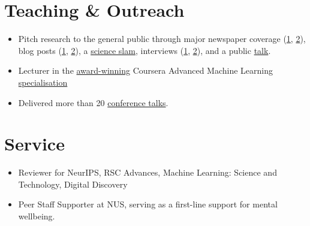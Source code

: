 \documentclass[11pt,a4paper]{article}
\begin{document}
\section{Teaching \& Outreach}
\begin{itemize}
  \item Pitch research to the general public through major newspaper coverage (\href{https://www.kommersant.ru/doc/7832307}{1}, \href{https://www.kommersant.ru/doc/6122817}{2}), blog posts (\href{https://ifim.nus.edu.sg/tailor-made-2d-materials-became-closer-with-the-new-machine-learning-algorithm-developed-at-nus/}{1}, \href{https://communities.springernature.com/posts/sparse-representation-for-machine-learning-the-properties-of-defects-in-2d-materials}{2}), a \href{https://elementy.ru/events/435506/IV\_Nauchnye\_boi\_NIU\_VShE\_na\_Dne\_Vyshki}{science slam}, interviews (\href{https://web.archive.org/web/20210518043835/https://academy.yandex.ru/posts/beresh-i-razbiraeshsya}{1}, \href{https://habr.com/en/company/yandex/blog/422761/}{2}), and a public \href{https://www.youtube.com/watch?v=zLFZ\_z-7-JI&feature=youtu.be&t=7779}{talk}.
  \item Lecturer in the \href{https://www.hse.ru/en/news/edu/259378493.html}{award-winning} Coursera Advanced Machine Learning \href{https://web.archive.org/web/20220127183223/https://www.coursera.org/specializations/aml}{  specialisation}
  \item Delivered more than 20 \href{https://docs.google.com/document/d/1IOlBse4q0YgEoL\_RCJTvJfbFhFaD\_YMAIJJ3W77B\_X0/edit?usp=sharing}{conference talks}.
\end{itemize}
\section{Service}
\begin{itemize}
  \item Reviewer for NeurIPS, RSC Advances, Machine Learning: Science and Technology, Digital Discovery
  \item Peer Staff Supporter at NUS, serving as a first-line support for mental wellbeing.
\end{itemize}

\newpage

\end{document}
